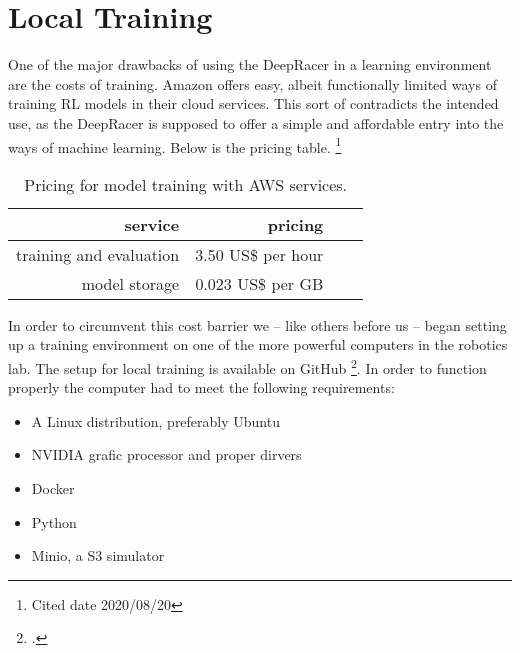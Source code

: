 \chapter{Local Training}
\label{cha:Diplomschrift}
 
 One of the major drawbacks of using the DeepRacer in a learning environment are the costs of training. Amazon offers easy, albeit functionally limited ways of training RL models in their cloud services. This sort of contradicts the intended use, as the DeepRacer is supposed to offer a simple and affordable entry into the ways of machine learning. Below is the pricing table. \footnote{Cited date 2020/08/20}
 \begin{table}
 \caption{Pricing for model training with AWS services.}
 \label{tab:services}
 \centering
 \setlength{\tabcolsep}{5mm}
 \def\arraystretch{1.25}
 \begin{tabular}{|r|r|c|c|}
 \hline
 \textbf{service} & \textbf{pricing} \\
 \hline\hline
 training and evaluation & 3.50 US\$ per hour \\
 \hline
 model storage & 0.023 US\$ per GB \\
 \hline
 \end{tabular}
 \end{table}
 In order to circumvent this cost barrier we -- like others before us -- began setting up a training environment on one of the more powerful computers in the robotics lab.
 The setup for local training is available on GitHub \footcite{https://github.com/aws-deepracer-community/deepracer}. In order to function properly the computer had to meet the following requirements:
 \begin{itemize}
 \item A Linux distribution, preferably Ubuntu
 \item NVIDIA grafic processor and proper dirvers
 \item Docker
 \item Python
 \item Minio, a S3 simulator
 \end{itemize}